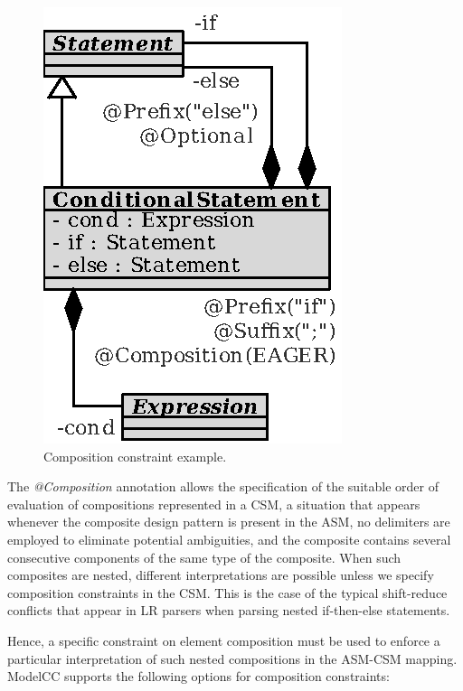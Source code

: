\documentclass[a4paper,twoside,onecolumn]{article}
\newcommand{\an}[1]{\emph{#1}} %
\begin{document}
\begin{figure}[tb!]
\centering
\includegraphics[scale=1]{conditional3.eps}
\caption{Composition constraint example.}
\label{fig:conditional3}
\end{figure}

The \an{@Composition} annotation allows the specification of the suitable order of evaluation of compositions represented in a CSM, a situation that appears whenever the composite design pattern is present in the ASM, no delimiters are employed to eliminate potential ambiguities, and the composite contains several consecutive components of the same type of the composite.
When such composites are nested, different interpretations are possible unless we specify composition constraints in the CSM.
This is the case of the typical shift-reduce conflicts that appear in LR parsers when parsing nested if-then-else statements.

Hence, a specific constraint on element composition must be used to enforce a particular interpretation of such nested compositions in the ASM-CSM mapping.
ModelCC supports the following options for composition constraints:
\end{document}
